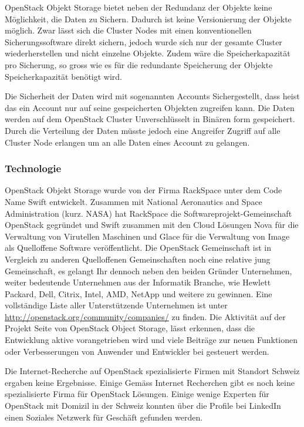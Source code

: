 OpenStack Objekt Storage bietet neben der Redundanz der Objekte keine Möglichkeit, die Daten zu Sichern. Dadurch ist keine Versionierung der Objekte möglich. Zwar lässt sich die Cluster Nodes mit einen konventionellen Sicherungssoftware direkt sichern, jedoch wurde sich nur der gesamte Cluster wiederherstellen und nicht einzelne Objekte. Zudem wäre die Speicherkapazität pro Sicherung, so gross wie es für die redundante Speicherung der Objekte Speicherkapazität benötigt wird. \cite{AndyBrezinsky2011}


Die Sicherheit der Daten wird mit sogenannten Accounts Sichergestellt, dass heist das ein Account nur auf seine gespeicherten Objekten zugreifen kann. Die Daten werden auf dem OpenStack Cluster Unverschlüsselt in Binären form gespeichert. Durch die Verteilung der Daten müsste jedoch eine Angreifer Zugriff auf alle Cluster Node erlangen um an alle Daten eines Account zu gelangen.

\subsubsection*{Technologie}
OpenStack Objekt Storage wurde von der Firma RackSpace unter dem Code Name Swift entwickelt. Zusammen mit National Aeronautics and Space Administration (kurz. NASA) hat RackSpace die Softwareprojekt-Gemeinschaft OpenStack gegründet und Swift zusammen mit den Cloud Lösungen Nova für die Verwaltung von Virutellen Maschinen und Glace für die Verwaltung von Image als Quelloffene Software veröffentlicht. Die OpenStack Gemeinschaft ist in Vergleich zu anderen Quelloffenen Gemeinschaften noch eine relative jung Gemeinschaft, es gelangt Ihr dennoch neben den beiden Gründer Unternehmen, weiter bedeutende Unternehmen aus der Informatik Branche, wie Hewlett Packard, Dell, Citrix, Intel, AMD, NetApp und weitere zu gewinnen. Eine vollständige Liste aller Unterstützende Unternehmen ist unter \url{http://openstack.org/community/companies/} zu finden. Die Aktivität auf der Projekt Seite von OpenStack Object Storage, lässt erkennen, dass die Entwicklung aktive vorangetrieben wird und viele Beiträge zur neuen Funktionen oder Verbesserungen von Anwender und Entwickler bei gesteuert werden. \cite{Ohloh2012}

Die Internet-Recherche auf OpenStack spezialisierte Firmen mit Standort Schweiz ergaben keine Ergebnisse. Einige
Gemäss Internet Recherchen gibt es noch keine spezialisierte Firma für OpenStack Lösungen. Einige wenige Experten für OpenStack mit Domizil in der Schweiz konnten über die Profile bei LinkedIn einen Soziales Netzwerk für Geschäft gefunden werden. 

